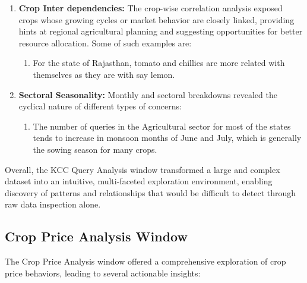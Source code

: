 \documentclass[a4paper, 12pt]{article}
\begin{document}
\begin{enumerate}
    \item \textbf{Crop Inter dependencies:} The crop-wise correlation analysis exposed crops whose growing cycles or market behavior are closely linked, providing hints at regional agricultural planning and suggesting opportunities for better resource allocation. Some of such examples are:
    \begin{enumerate}
        \item For the state of Rajasthan, tomato and chillies are more related with themselves as they are with say lemon.
    \end{enumerate}

    \item \textbf{Sectoral Seasonality:} Monthly and sectoral breakdowns revealed the cyclical nature of different types of concerns:
    \begin{enumerate}
        \item The number of queries in the Agricultural sector for most of the states tends to increase in monsoon months of June and July, which is generally the sowing season for many crops. 
    \end{enumerate}
\end{enumerate}

Overall, the KCC Query Analysis window transformed a large and complex dataset into an intuitive, multi-faceted exploration environment, enabling discovery of patterns and relationships that would be difficult to detect through raw data inspection alone.

\subsection{Crop Price Analysis Window}

The Crop Price Analysis window offered a comprehensive exploration of crop price behaviors, leading to several actionable insights:
\end{document}
